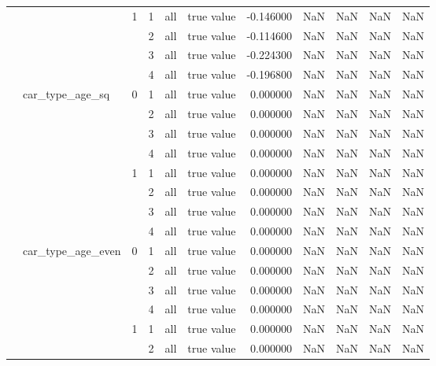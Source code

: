 \begin{tabular}{llllllrrrrr}
\cline{3-11} \cline{4-11} \cline{5-11}
 &  & \multirow[t]{4}{*}{1} & 1 & all & true value & -0.146000 & NaN & NaN & NaN & NaN \\
\cline{4-11} \cline{5-11}
 &  &  & 2 & all & true value & -0.114600 & NaN & NaN & NaN & NaN \\
\cline{4-11} \cline{5-11}
 &  &  & 3 & all & true value & -0.224300 & NaN & NaN & NaN & NaN \\
\cline{4-11} \cline{5-11}
 &  &  & 4 & all & true value & -0.196800 & NaN & NaN & NaN & NaN \\
\cline{2-11} \cline{3-11} \cline{4-11} \cline{5-11}
 & \multirow[t]{8}{*}{car_type_age_sq} & \multirow[t]{4}{*}{0} & 1 & all & true value & 0.000000 & NaN & NaN & NaN & NaN \\
\cline{4-11} \cline{5-11}
 &  &  & 2 & all & true value & 0.000000 & NaN & NaN & NaN & NaN \\
\cline{4-11} \cline{5-11}
 &  &  & 3 & all & true value & 0.000000 & NaN & NaN & NaN & NaN \\
\cline{4-11} \cline{5-11}
 &  &  & 4 & all & true value & 0.000000 & NaN & NaN & NaN & NaN \\
\cline{3-11} \cline{4-11} \cline{5-11}
 &  & \multirow[t]{4}{*}{1} & 1 & all & true value & 0.000000 & NaN & NaN & NaN & NaN \\
\cline{4-11} \cline{5-11}
 &  &  & 2 & all & true value & 0.000000 & NaN & NaN & NaN & NaN \\
\cline{4-11} \cline{5-11}
 &  &  & 3 & all & true value & 0.000000 & NaN & NaN & NaN & NaN \\
\cline{4-11} \cline{5-11}
 &  &  & 4 & all & true value & 0.000000 & NaN & NaN & NaN & NaN \\
\cline{2-11} \cline{3-11} \cline{4-11} \cline{5-11}
 & \multirow[t]{8}{*}{car_type_age_even} & \multirow[t]{4}{*}{0} & 1 & all & true value & 0.000000 & NaN & NaN & NaN & NaN \\
\cline{4-11} \cline{5-11}
 &  &  & 2 & all & true value & 0.000000 & NaN & NaN & NaN & NaN \\
\cline{4-11} \cline{5-11}
 &  &  & 3 & all & true value & 0.000000 & NaN & NaN & NaN & NaN \\
\cline{4-11} \cline{5-11}
 &  &  & 4 & all & true value & 0.000000 & NaN & NaN & NaN & NaN \\
\cline{3-11} \cline{4-11} \cline{5-11}
 &  & \multirow[t]{4}{*}{1} & 1 & all & true value & 0.000000 & NaN & NaN & NaN & NaN \\
\cline{4-11} \cline{5-11}
 &  &  & 2 & all & true value & 0.000000 & NaN & NaN & NaN & NaN \\

\end{tabular}
